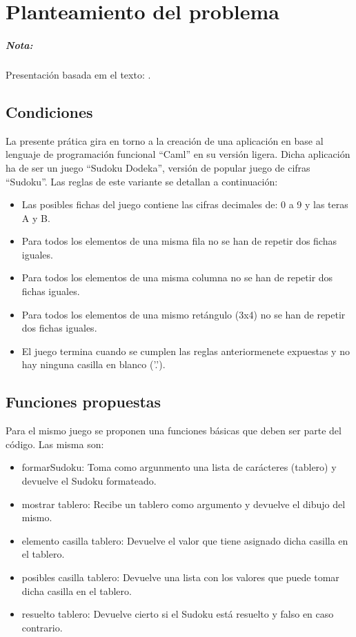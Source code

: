 \chapter{Planteamiento del problema}

\paragraph{Nota:} Presentación basada em el texto: \cite{aalpa}.

\section{Condiciones}

La presente prática gira en torno a la creación de una aplicación en base al
lenguaje de programación funcional ``Caml'' en su versión ligera. Dicha
aplicación ha de ser un juego ``Sudoku Dodeka'', versión de popular juego de
cifras ``Sudoku''. Las reglas de este variante se detallan a continuación:

\begin{itemize}
\item Las posibles fichas del juego contiene las cifras decimales de: 0 a 9 y
las teras A y B.
\item Para todos los elementos de una misma fila no se han de repetir dos fichas
iguales.
\item Para todos los elementos de una misma columna no se han de repetir dos
fichas iguales.
\item Para todos los elementos de una mismo ret\'angulo (3x4) no se han de
repetir dos fichas iguales. 
\item El juego termina cuando se cumplen las reglas anteriormenete expuestas y
no hay ninguna casilla en blanco ('.').
\end{itemize}

\section{Funciones propuestas}

Para el mismo juego se proponen una funciones básicas que deben ser parte del
código. Las misma son:

\begin{itemize}
\item formarSudoku: Toma como argunmento una lista de carácteres (tablero) y
devuelve el Sudoku formateado.
\item mostrar tablero: Recibe un tablero como argumento y devuelve el dibujo del
mismo.
\item elemento casilla tablero: Devuelve el valor que tiene asignado dicha
casilla en el tablero.
\item posibles casilla tablero: Devuelve una lista con los valores que puede
tomar dicha casilla en el tablero.
\item resuelto tablero: Devuelve cierto si el Sudoku está resuelto y falso en
caso contrario.
\end{itemize}


